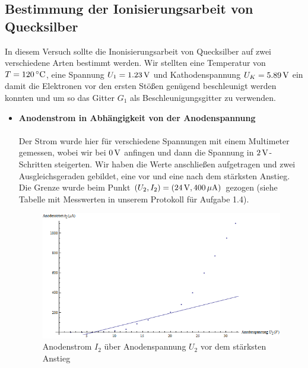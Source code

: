 \documentclass[a4paper,titlepage]{scrartcl}
\numberwithin{equation}{section}
\begin{document}
\subsection{Bestimmung der Ionisierungsarbeit von Quecksilber}
In diesem Versuch sollte die Inonisierungsarbeit von Quecksilber auf zwei verschiedene Arten bestimmt werden. Wir stellten eine Temperatur von $T=\unit[120]{^\circ C}$, eine Spannung $U_1=\unit[1.23]{V}$ und Kathodenspannung $U_K=\unit[5.89]{V}$ ein damit die Elektronen vor den ersten Stößen genügend beschleunigt werden konnten und um so das Gitter $G_1$ als Beschleunigungsgitter zu verwenden.\\

\begin{itemize}
\item \textbf{Anodenstrom in Abhängigkeit von der Anodenspannung}\\ \\
Der Strom wurde hier für verschiedene Spannungen mit einem Multimeter gemessen, wobei wir bei $\unit[0]{V}$ anfingen und dann die Spannung in $\unit[2]{V}$-Schritten steigerten. Wir haben die Werte anschließen aufgetragen und zwei Ausgleichsgeraden gebildet, eine vor und eine nach dem stärksten Anstieg. Die Grenze wurde beim Punkt $(U_2,I_2)=(\unit[24]{V}, \unit[400]{\mu A})$ gezogen (siehe Tabelle mit Messwerten in unserem Protokoll für Aufgabe 1.4).

\begin{figure}[H]
\centering
\includegraphics[scale=.7]{bilder/aufgabe1_4a1.png} 
\caption{Anodenstrom $I_2$ über Anodenspannung $U_2$ vor dem stärksten Anstieg}
\end{figure}


\end{itemize}
\end{document}
